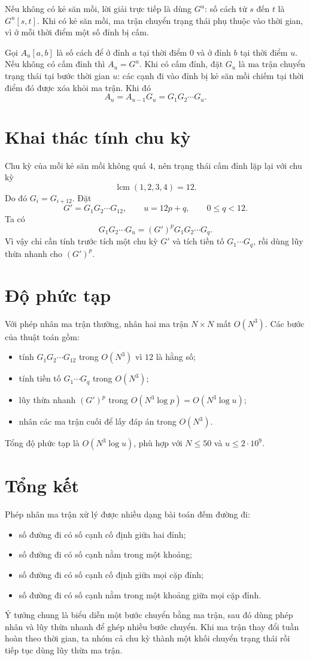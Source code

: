 \documentclass[11pt]{article}
\begin{document}
Nếu không có kẻ săn mồi, lời giải trực tiếp là dùng $G^u$: số cách từ
$s$ đến $t$ là $G^u[s,t]$. Khi có kẻ săn mồi, ma trận chuyển trạng thái
phụ thuộc vào thời gian, vì ở mỗi thời điểm một số đỉnh bị cấm.

Gọi $A_u[a,b]$ là số cách để ở đỉnh $a$ tại thời điểm $0$ và ở đỉnh
$b$ tại thời điểm $u$. Nếu không có cấm đỉnh thì $A_u=G^u$. Khi có cấm
đỉnh, đặt $G_u$ là ma trận chuyển trạng thái tại bước thời gian $u$:
các cạnh đi vào đỉnh bị kẻ săn mồi chiếm tại thời điểm đó được xóa khỏi
ma trận. Khi đó
\[
  A_u=A_{u-1}G_u=G_1G_2\cdots G_u.
\]

\section{Khai thác tính chu kỳ}

Chu kỳ của mỗi kẻ săn mồi không quá $4$, nên trạng thái cấm đỉnh lặp
lại với chu kỳ
\[
  \operatorname{lcm}(1,2,3,4)=12.
\]
Do đó $G_i=G_{i+12}$. Đặt
\[
  G'=G_1G_2\cdots G_{12},\qquad u=12p+q,\qquad 0\le q<12.
\]
Ta có
\[
  G_1G_2\cdots G_u=(G')^pG_1G_2\cdots G_q.
\]
Vì vậy chỉ cần tính trước tích một chu kỳ $G'$ và tích tiền tố
$G_1\cdots G_q$, rồi dùng lũy thừa nhanh cho $(G')^p$.

\section{Độ phức tạp}

Với phép nhân ma trận thường, nhân hai ma trận $N\times N$ mất
$O(N^3)$. Các bước của thuật toán gồm:
\begin{itemize}
  \item tính $G_1G_2\cdots G_{12}$ trong $O(N^3)$ vì $12$ là hằng số;
  \item tính tiền tố $G_1\cdots G_q$ trong $O(N^3)$;
  \item lũy thừa nhanh $(G')^p$ trong $O(N^3\log p)=O(N^3\log u)$;
  \item nhân các ma trận cuối để lấy đáp án trong $O(N^3)$.
\end{itemize}
Tổng độ phức tạp là $O(N^3\log u)$, phù hợp với $N\le 50$ và
$u\le 2\cdot 10^9$.

\section{Tổng kết}

Phép nhân ma trận xử lý được nhiều dạng bài toán đếm đường đi:
\begin{itemize}
  \item số đường đi có số cạnh cố định giữa hai đỉnh;
  \item số đường đi có số cạnh nằm trong một khoảng;
  \item số đường đi có số cạnh cố định giữa mọi cặp đỉnh;
  \item số đường đi có số cạnh nằm trong một khoảng giữa mọi cặp đỉnh.
\end{itemize}

Ý tưởng chung là biểu diễn một bước chuyển bằng ma trận, sau đó dùng
phép nhân và lũy thừa nhanh để ghép nhiều bước chuyển. Khi ma trận thay
đổi tuần hoàn theo thời gian, ta nhóm cả chu kỳ thành một khối chuyển
trạng thái rồi tiếp tục dùng lũy thừa ma trận.
\end{document}
